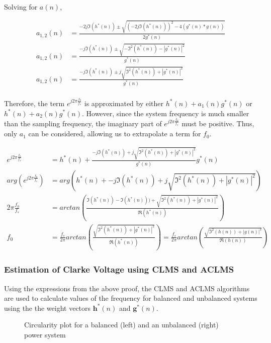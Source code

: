 \documentclass[main.tex]{subfiles}
\begin{document}
Solving for $a(n)$,

\begin{align*}
a_{1,2}(n) &= \frac{-2j\Im(h^*(n)) \pm \sqrt{ (-2j\Im(h^*(n)))^2 -4(g^*(n) * g(n)) } }{2g^*(n)}\\
a_{1,2}(n) &= \frac{-j\Im(h^*(n)) \pm \sqrt{ -\Im^2(h^*(n)) -|g^*(n)|^2 } }{g^*(n)}\\
a_{1,2}(n) &= \frac{-j\Im(h^*(n)) \pm j\sqrt{ \Im^2(h^*(n)) + |g^*(n)|^2 } }{g^*(n)}\\
\end{align*}

Therefore, the term $e^{j2\pi\frac{f_0}{f_s}}$ is approximated by either $h^*(n) + a_1(n)g^*(n)$ or $h^*(n) + a_2(n)g^*(n)$. However, since the system frequency is much smaller than the sampling frequency, the imaginary part of $e^{j2\pi\frac{f_0}{f_s}}$ must be positive. Thus, only $a_1$ can be considered, allowing us to extrapolate a term for $f_0$.

\begin{align*}
e^{j2\pi\frac{f_0}{f_s}} &= h^*(n) + \frac{-j\Im(h^*(n)) + j\sqrt{ \Im^2(h^*(n)) + |g^*(n)|^2 } }{g^*(n)}g^*(n)\\
arg(e^{j2\pi\frac{f_0}{f_s}}) &= arg\left(h^*(n) + -j\Im(h^*(n)) + j\sqrt{ \Im^2(h^*(n)) + |g^*(n)|^2 } \right)\\
2\pi\frac{f_0}{f_s} &= arctan(\frac{\Im(h^*(n)) - \Im(h^*(n)))+\sqrt{ \Im^2(h^*(n)) + |g^*(n)|^2 }}{\Re(h^*(n))})\\
f_0 &= \frac{f_s}{2\pi}arctan(\frac{\sqrt{ \Im^2(h^*(n)) + |g^*(n)|^2 }}{\Re(h^*(n))}) = \frac{f_s}{2\pi}arctan(\frac{\sqrt{ \Im^2(h(n)) + |g(n)|^2 }}{\Re(h(n))})
\end{align*}


\subsubsection{Estimation of Clarke Voltage using CLMS and ACLMS}

Using the expressions from the above proof, the CLMS and ACLMS algorithms are used to calculate values of the frequency for balanced and unbalanced systems using the the weight vectors $\textbf{h}^*(n)$ and $\textbf{g}^*(n)$. 

\begin{figure}[H]
	\centering 
	\resizebox{0.8\textwidth}{!}{}
	\caption{Circularity plot for a balanced (left) and an unbalanced (right) power system}
	\label{fig:q4_1_e}
\end{figure}
\end{document}

